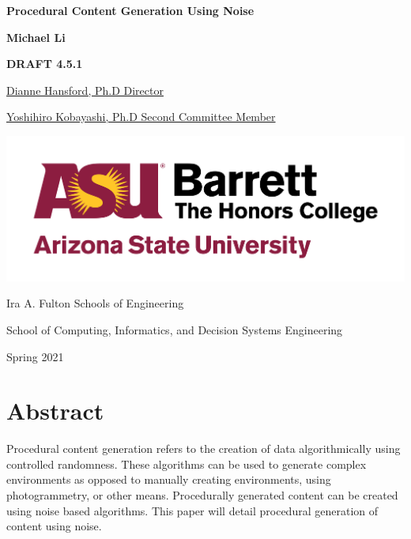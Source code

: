 \documentclass[10pt]{report}
\begin{document}
	\begin{titlepage}
		\begin{center}
			\Large
			\textbf{Procedural Content Generation Using Noise}
			
			\vspace{1.5cm}
			\normalsize
			\textbf{Michael Li}
			
			\vfill
			
			\textbf{DRAFT 4.5.1}
			
			\uline{Dianne Hansford, Ph.D \hfill Director}
			\vspace{1cm}
			
			\uline{Yoshihiro Kobayashi, Ph.D \hfill Second Committee Member}
			
			\vspace{3cm}
			
			\includegraphics[scale=.5]{asu_barretthonors_horiz_rgb_maroongold_600ppi}
			
			\vspace{1.5cm}
			Ira A. Fulton Schools of Engineering
			
			School of Computing, Informatics, and Decision Systems Engineering
			
			Spring 2021
			
		\end{center}
	\end{titlepage}
	
	\chapter*{Abstract}
	
	Procedural content generation refers to the creation of data algorithmically using controlled randomness. These algorithms can be used to generate complex environments as opposed to manually creating environments, using photogrammetry, or other means. Procedurally generated content can be created using noise based algorithms. This paper will detail procedural generation of content using noise.
	
\end{document}
